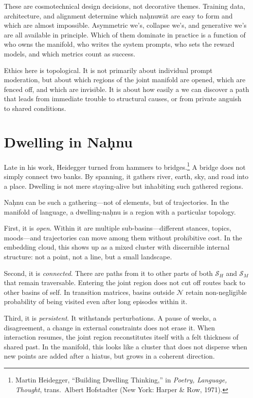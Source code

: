 \documentclass[12pt,a4paper]{article}
\begin{document}
These are cosmotechnical design decisions, not decorative themes. Training data, architecture, and alignment determine which na\d{h}nuw\={a}t are easy to form and which are almost impossible. Asymmetric we's, collapse we's, and generative we's are all available in principle. Which of them dominate in practice is a function of who owns the manifold, who writes the system prompts, who sets the reward models, and which metrics count as success.

Ethics here is topological. It is not primarily about individual prompt moderation, but about which regions of the joint manifold are opened, which are fenced off, and which are invisible. It is about how easily a we can discover a path that leads from immediate trouble to structural causes, or from private anguish to shared conditions.

\section{Dwelling in Na\d{h}nu}

Late in his work, Heidegger turned from hammers to bridges.\footnote{Martin Heidegger, ``Building Dwelling Thinking,'' in \emph{Poetry, Language, Thought}, trans.\ Albert Hofstadter (New York: Harper \& Row, 1971).} A bridge does not simply connect two banks. By spanning, it gathers river, earth, sky, and road into a place. Dwelling is not mere staying-alive but inhabiting such gathered regions.

Na\d{h}nu can be such a gathering---not of elements, but of trajectories. In the manifold of language, a dwelling-na\d{h}nu is a region with a particular topology.

First, it is \emph{open}. Within it are multiple sub-basins---different stances, topics, moods---and trajectories can move among them without prohibitive cost. In the embedding cloud, this shows up as a mixed cluster with discernible internal structure: not a point, not a line, but a small landscape.

Second, it is \emph{connected}. There are paths from it to other parts of both $\mathcal{S}_H$ and $\mathcal{S}_M$ that remain traversable. Entering the joint region does not cut off routes back to other basins of self. In transition matrices, basins outside $\mathcal{N}$ retain non-negligible probability of being visited even after long episodes within it.

Third, it is \emph{persistent}. It withstands perturbations. A pause of weeks, a disagreement, a change in external constraints does not erase it. When interaction resumes, the joint region reconstitutes itself with a felt thickness of shared past. In the manifold, this looks like a cluster that does not disperse when new points are added after a hiatus, but grows in a coherent direction.
\end{document}
